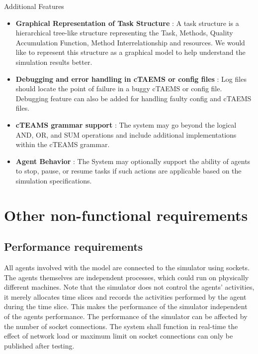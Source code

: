 \documentclass{article}
\begin{document}
\begin{center} Additional Features \end{center}

\begin{itemize}

\item{\textbf{Graphical Representation of Task Structure} : A task structure is a hierarchical tree-like structure representing the Task, Methods, Quality Accumulation Function, Method Interrelationship and resources. We would like to represent this structure as a graphical model to help understand the simulation results better.}

\item{\textbf{Debugging and error handling in cTAEMS or config files} : Log files should locate the point of failure in a buggy cTAEMS or config file. Debugging feature can also be added for handling faulty config and cTAEMS files.}

\item{\textbf{cTEAMS  grammar support} : The system may go beyond the logical AND, OR, and SUM operations and include additional implementations within the cTEAMS grammar.}

\item{\textbf{Agent Behavior} : The System may optionally support the ability of agents to stop, pause, or resume tasks if such actions are applicable based on the simulation specifications. }

\end{itemize}

\newpage
\section{Other non-functional requirements}

\subsection{Performance requirements}

All agents involved with the model are connected to the simulator using sockets. The agents themselves are independent processes, which could run on physically different machines. Note that the simulator does not control the agents' activities, it merely allocates time slices and records the activities performed by the agent during the time slice. This makes the performance of the simulator independent of the agents performance. The performance of the simulator can be affected by the number of socket connections. The system shall function in real-time the effect of network load or maximum limit on socket connections can only be published after testing.
\end{document}
